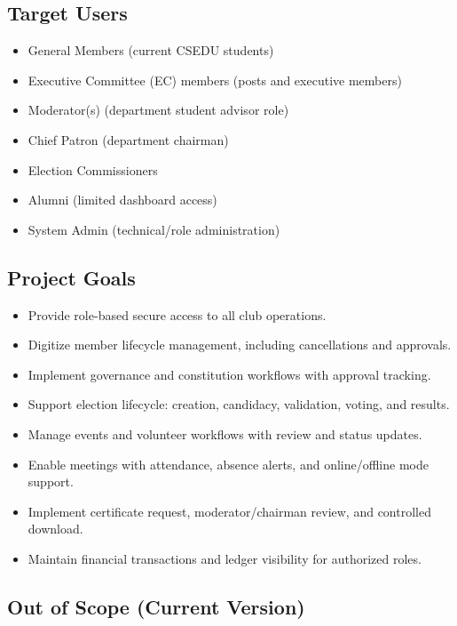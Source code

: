 \documentclass[12pt,a4paper]{article}
\begin{document}
\subsection{Target Users}

\begin{itemize}[noitemsep]
  \item General Members (current CSEDU students)
  \item Executive Committee (EC) members (posts and executive members)
  \item Moderator(s) (department student advisor role)
  \item Chief Patron (department chairman)
  \item Election Commissioners
  \item Alumni (limited dashboard access)
  \item System Admin (technical/role administration)
\end{itemize}

\subsection{Project Goals}

\begin{itemize}[noitemsep]
  \item Provide role-based secure access to all club operations.
  \item Digitize member lifecycle management, including cancellations and approvals.
  \item Implement governance and constitution workflows with approval tracking.
  \item Support election lifecycle: creation, candidacy, validation, voting, and results.
  \item Manage events and volunteer workflows with review and status updates.
  \item Enable meetings with attendance, absence alerts, and online/offline mode support.
  \item Implement certificate request, moderator/chairman review, and controlled download.
  \item Maintain financial transactions and ledger visibility for authorized roles.
\end{itemize}

\subsection{Out of Scope (Current Version)}
\end{document}
